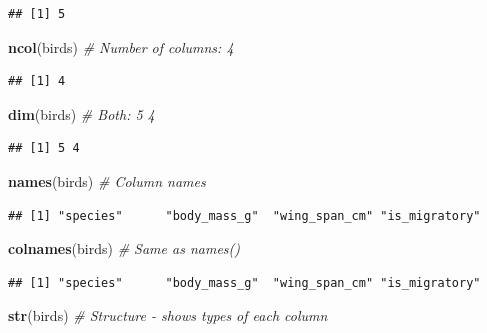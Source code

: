 \documentclass[
]{article}
\newenvironment{Shaded}{\begin{snugshade}}{\end{snugshade}}
\newcommand{\CommentTok}[1]{\textcolor[rgb]{0.56,0.35,0.01}{\textit{#1}}}
\newcommand{\FunctionTok}[1]{\textcolor[rgb]{0.13,0.29,0.53}{\textbf{#1}}}
\newcommand{\NormalTok}[1]{#1}
\begin{document}
\begin{verbatim}
## [1] 5
\end{verbatim}

\begin{Shaded}
\begin{Highlighting}[]
\FunctionTok{ncol}\NormalTok{(birds)         }\CommentTok{\# Number of columns: 4}
\end{Highlighting}
\end{Shaded}

\begin{verbatim}
## [1] 4
\end{verbatim}

\begin{Shaded}
\begin{Highlighting}[]
\FunctionTok{dim}\NormalTok{(birds)          }\CommentTok{\# Both: 5 4}
\end{Highlighting}
\end{Shaded}

\begin{verbatim}
## [1] 5 4
\end{verbatim}

\begin{Shaded}
\begin{Highlighting}[]
\FunctionTok{names}\NormalTok{(birds)        }\CommentTok{\# Column names}
\end{Highlighting}
\end{Shaded}

\begin{verbatim}
## [1] "species"      "body_mass_g"  "wing_span_cm" "is_migratory"
\end{verbatim}

\begin{Shaded}
\begin{Highlighting}[]
\FunctionTok{colnames}\NormalTok{(birds)     }\CommentTok{\# Same as names()}
\end{Highlighting}
\end{Shaded}

\begin{verbatim}
## [1] "species"      "body_mass_g"  "wing_span_cm" "is_migratory"
\end{verbatim}

\begin{Shaded}
\begin{Highlighting}[]
\FunctionTok{str}\NormalTok{(birds)          }\CommentTok{\# Structure {-} shows types of each column}
\end{Highlighting}
\end{Shaded}
\end{document}
